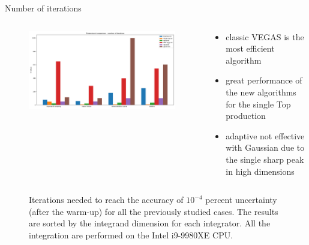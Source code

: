 \documentclass[t,handout,professionalfont,serif]{beamer}
\begin{document}
\begin{frame}{Number of iterations}
	
		\tiny
	\begin{columns}
		\begin{column}{0.7 \textwidth}
			\begin{figure}
				\includegraphics[width= \columnwidth]{../tex/images/iter_final.png}
			\end{figure}
			
		\end{column}
		\hspace{-0.5cm}
		\begin{column}{0.3 \textwidth}
			\vspace{1cm}
			
			\begin{itemize}
				
				\item classic VEGAS is the most efficient algorithm
				\item great performance of the new algorithms for the single Top production
				\item adaptive not effective with Gaussian due to the single sharp peak in high dimensions
			\end{itemize}
		\end{column}
	\end{columns}
	
		\begin{figure}
		\caption{Iterations needed to reach the accuracy of $10^{-4}$ percent uncertainty (after the warm-up) for all the previously studied cases. The results are sorted by the integrand dimension for each integrator. All the integration are performed on the Intel i9-9980XE CPU. }
	\end{figure}
	
\end{frame}
\end{document}
